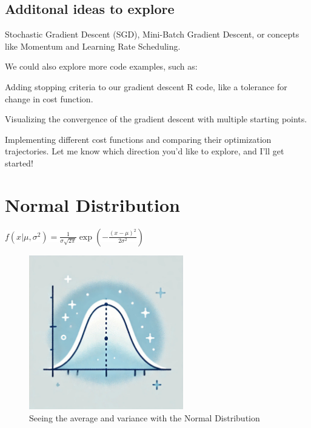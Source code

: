 \documentclass[
  12 pt,
  a4paper,
]{book}
\numberwithin{equation}{section}
\theoremstyle{plain}      %
\theoremstyle{definition} %
\theoremstyle{remark}     %
\theoremstyle{note}         %
\begin{document}
\normalsize
{}

\newpage

\hypertarget{additonal-ideas-to-explore}{%
\section{Additonal ideas to explore}\label{additonal-ideas-to-explore}}

Stochastic Gradient Descent (SGD), Mini-Batch Gradient Descent, or
concepts like Momentum and Learning Rate Scheduling.

We could also explore more code examples, such as:

Adding stopping criteria to our gradient descent R code, like a
tolerance for change in cost function.

Visualizing the convergence of the gradient descent with multiple
starting points.

Implementing different cost functions and comparing their optimization
trajectories. Let me know which direction you'd like to explore, and
I'll get started!

\newpage

\hypertarget{normal-distribution}{%
\chapter{Normal Distribution}\label{normal-distribution}}

\begin{center}
\colorbox{white}{\color{navyimpactblue} \huge $f(x | \mu, \sigma^2) = \frac{1}{\sigma \sqrt{2\pi}} \exp\left( - \frac{(x - \mu)^2}{2\sigma^2} \right)$}
\end{center}

\hfill\break

\begin{figure}[h!]
  \begin{center}
    \includegraphics[width=0.6\textwidth]{pictures/Whimsical-2-normal_distribution.jpeg}
    \caption*{\Large Seeing the average and variance with the Normal Distribution}
  \end{center}
\end{figure}
\end{document}
